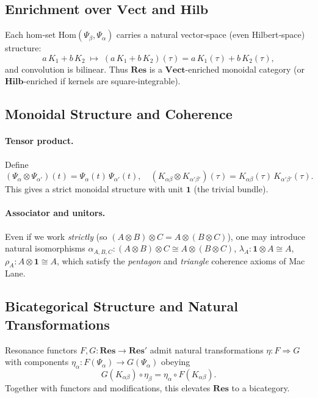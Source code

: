 \subsection{Enrichment over \(\mathbf{Vect}\) and \(\mathbf{Hilb}\)}

Each hom‐set \(\mathrm{Hom}(\Psi_{\beta},\Psi_{\alpha})\) carries a natural vector‐space (even Hilbert‐space) structure:
\[
  a\,K_{1} + b\,K_{2}
  \;\mapsto\;
  (a\,K_{1}+b\,K_{2})(\tau)
  = a\,K_{1}(\tau)+b\,K_{2}(\tau),
\]
and convolution is bilinear.  Thus \(\mathbf{Res}\) is a \(\mathbf{Vect}\)-enriched monoidal category (or \(\mathbf{Hilb}\)-enriched if kernels are square‐integrable).

\subsection{Monoidal Structure and Coherence}

\paragraph{Tensor product.}  Define
\[
  (\Psi_{\alpha}\otimes\Psi_{\alpha'})(t)
  = \Psi_{\alpha}(t)\,\Psi_{\alpha'}(t),
\quad
  (K_{\alpha\beta}\otimes K_{\alpha'\beta'})(\tau)
  = K_{\alpha\beta}(\tau)\,K_{\alpha'\beta'}(\tau).
\]
This gives a strict monoidal structure with unit \(\mathbf{1}\) (the trivial bundle).

\paragraph{Associator and unitors.}  Even if we work \emph{strictly} (so \((A\otimes B)\otimes C = A\otimes(B\otimes C)\)), one may introduce natural isomorphisms
\(\alpha_{A,B,C}\colon (A\otimes B)\otimes C \cong A\otimes (B\otimes C)\),
\(\lambda_{A}\colon \mathbf{1}\otimes A\cong A\),
\(\rho_{A}\colon A\otimes \mathbf{1}\cong A\),
which satisfy the {\it pentagon} and {\it triangle} coherence axioms of Mac Lane.

\subsection{Bicategorical Structure and Natural Transformations}

Resonance functors \(F,G\colon \mathbf{Res}\to\mathbf{Res'}\) admit natural transformations
\(\eta\colon F\Rightarrow G\) with components
\(\eta_{\alpha}\colon F(\Psi_{\alpha})\to G(\Psi_{\alpha})\)
obeying
\[
  G(K_{\alpha\beta})\circ \eta_{\beta}
  = \eta_{\alpha}\circ F(K_{\alpha\beta}).
\]
Together with functors and modifications, this elevates \(\mathbf{Res}\) to a bicategory.

